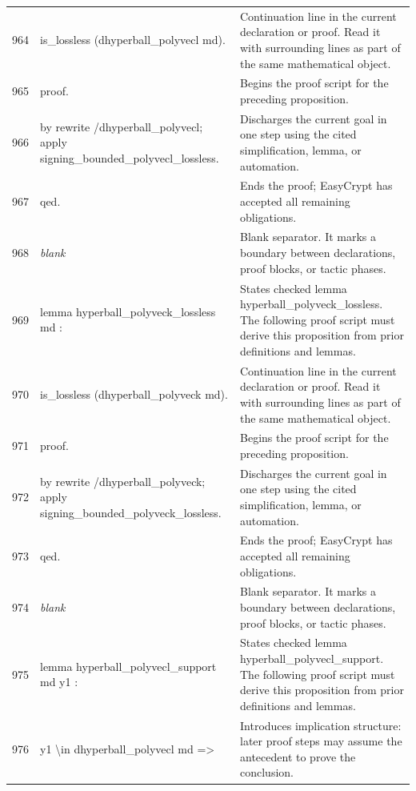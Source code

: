 \documentclass[10pt]{article}
\begin{document}
\begin{longtable}{r L{0.53\textwidth} L{0.37\textwidth}}
964 & {\ttfamily\scriptsize   is\_lossless (dhyperball\_polyvecl md).} & Continuation line in the current declaration or proof.  Read it with surrounding lines as part of the same mathematical object. \\
965 & {\ttfamily\scriptsize proof.} & Begins the proof script for the preceding proposition. \\
966 & {\ttfamily\scriptsize by rewrite /dhyperball\_polyvecl; apply signing\_bounded\_polyvecl\_lossless.} & Discharges the current goal in one step using the cited simplification, lemma, or automation. \\
967 & {\ttfamily\scriptsize qed.} & Ends the proof; EasyCrypt has accepted all remaining obligations. \\
968 & {\ttfamily\scriptsize \emph{blank}} & Blank separator.  It marks a boundary between declarations, proof blocks, or tactic phases. \\
969 & {\ttfamily\scriptsize lemma hyperball\_polyveck\_lossless md :} & States checked lemma hyperball\_polyveck\_lossless.  The following proof script must derive this proposition from prior definitions and lemmas. \\
970 & {\ttfamily\scriptsize   is\_lossless (dhyperball\_polyveck md).} & Continuation line in the current declaration or proof.  Read it with surrounding lines as part of the same mathematical object. \\
971 & {\ttfamily\scriptsize proof.} & Begins the proof script for the preceding proposition. \\
972 & {\ttfamily\scriptsize by rewrite /dhyperball\_polyveck; apply signing\_bounded\_polyveck\_lossless.} & Discharges the current goal in one step using the cited simplification, lemma, or automation. \\
973 & {\ttfamily\scriptsize qed.} & Ends the proof; EasyCrypt has accepted all remaining obligations. \\
974 & {\ttfamily\scriptsize \emph{blank}} & Blank separator.  It marks a boundary between declarations, proof blocks, or tactic phases. \\
975 & {\ttfamily\scriptsize lemma hyperball\_polyvecl\_support md y1 :} & States checked lemma hyperball\_polyvecl\_support.  The following proof script must derive this proposition from prior definitions and lemmas. \\
976 & {\ttfamily\scriptsize   y1 \textbackslash{}in dhyperball\_polyvecl md =>} & Introduces implication structure: later proof steps may assume the antecedent to prove the conclusion. \\

\end{longtable}
\end{document}
